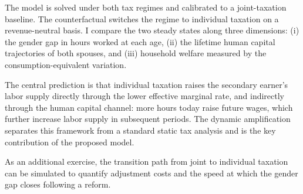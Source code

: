 The model is solved under both tax regimes and calibrated to a joint-taxation baseline.
The counterfactual switches the regime to individual taxation on a revenue-neutral basis.
I compare the two steady states along three dimensions: (i) the gender gap in hours worked at each age, (ii) the lifetime human capital trajectories of both spouses, and (iii) household welfare measured by the consumption-equivalent variation.

The central prediction is that individual taxation raises the secondary earner's labor supply directly through the lower effective marginal rate, and indirectly through the human capital channel: more hours today raise future wages, which further increase labor supply in subsequent periods.
The dynamic amplification separates this framework from a standard static tax analysis and is the key contribution of the proposed model.

As an additional exercise, the transition path from joint to individual taxation can be simulated to quantify adjustment costs and the speed at which the gender gap closes following a reform.
